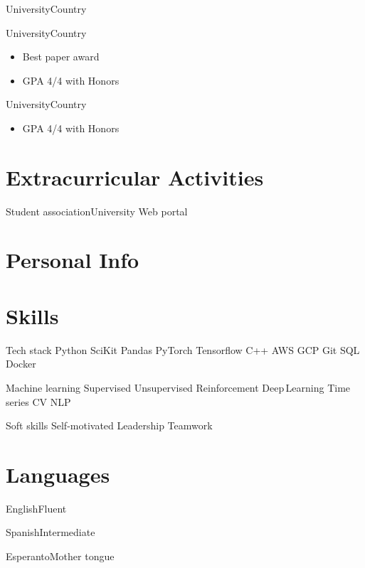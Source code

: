 \documentclass[letterpaper, 10pt, yearbullet]{techcv}
\begin{document}
\begin{paracol}{2}
\begin{joblist}
    {University}{Country}{}

    {University}{Country}
    {\begin{itemize}
            \item Best paper award
            \item GPA 4/4 with Honors
        \end{itemize}}

    {University}{Country}
    {\begin{itemize}
            \item GPA 4/4 with Honors
        \end{itemize}}
\end{joblist}


\section{Extracurricular Activities}
\begin{joblist}
	{Student association}{University}
    {\lipsum[66]}
    {Web portal}{}
    {\lipsum[66]}
\end{joblist}


\switchcolumn


\vspace{-0.5\baselineskip}
\section{Personal Info}
\makecontact


\section{Skills}

\begin{skills}
\item{Tech stack}
    {Python SciKit Pandas PyTorch Tensorflow
	C++ AWS GCP Git SQL Docker }
\item{Machine learning}
	{Supervised Unsupervised Reinforcement Deep\,Learning 
    Time\,series CV NLP}
\item{Soft skills}
	{  
	Self-motivated
    Leadership
    Teamwork
}
\end{skills}


\section{Languages}
\begin{languages}
    \item{English}{Fluent}	
    \item{Spanish}{Intermediate}
    \item{Esperanto}{Mother tongue}
\end{languages}



\end{paracol}
\end{document}
